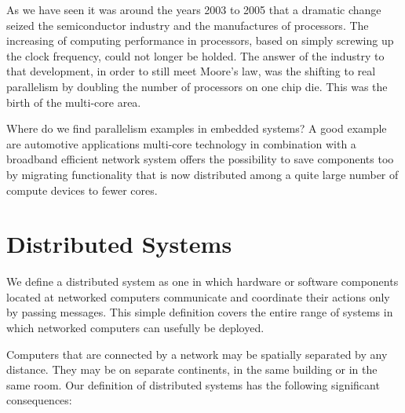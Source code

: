 As we have seen it was around the years 2003 to 2005 that a dramatic change
seized the semiconductor industry and the manufactures of processors. The
increasing of computing performance in processors, based on simply screwing up
the clock frequency, could not longer be holded. The answer of the industry to
that development, in order to still meet Moore's law, was the shifting to real
parallelism by doubling the number of processors on one chip die. This was the
birth of the multi-core area. 

Where do we find parallelism  examples in embedded systems? A good example are
automotive applications multi-core technology in combination with a broadband
efficient network system offers the possibility to save components too by
migrating functionality that is now distributed among a quite large number of
compute devices to fewer cores.


\section{Distributed Systems}
\noindent

We define a distributed system as one in which hardware or software components
located at networked computers communicate and coordinate their actions only by
passing messages. This simple definition covers the entire range of systems in
which networked computers can usefully be deployed.

Computers that are connected by a network may be spatially separated by any
distance. They may be on separate continents, in the same building or in the
same room. Our definition of distributed systems has the following significant
consequences:


